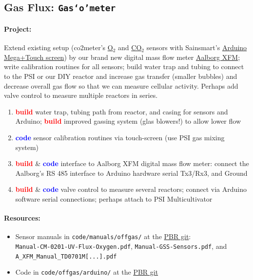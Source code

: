 \documentclass[12pt,a4paper]{scrartcl}
\newcommand{\git}[0]{\href{https://git.hhu.de/machne/pbr_hackathon_201503}{PBR git}}
\newcommand{\build}[0]{\textcolor{red}{\textbf{build}}}
\newcommand{\code}[0]{\textcolor{blue}{\textbf{code}}}
\newcommand{\gasometer}[0]{\texttt{Gas`o'meter}}
\newcommand{\ox}[0]{O$_2$}
\newcommand{\cox}[0]{CO$_2$}
\begin{document}
\newpage
\subsection{Gas Flux: \gasometer{}}
\label{gas}
\paragraph{Project:} 
Extend existing setup (co2meter's
\href{http://www.co2meter.com/collections/co2-sensors/oxygen-sensors}{\ox{}}
and
\href{http://www.co2meter.com/collections/co2-sensors/products/cozir-5-100-co2-sensor}{\cox{}}
sensors with Sainsmart's
\href{http://www.sainsmart.com/featured-products/sainsmart-mega2560-board-3-5-tft-lcd-module-display-shield-kit-for-atmel-atmega-avr-16au-atmega8u2.html}{Arduino
  Mega+Touch screen}) by our brand new digital mass flow meter
\href{http://www.aalborg.com/index.php/main_page/product_overview/id_product_overview/63}{Aalborg
  XFM}; write calibration routines for all sensors; build water trap
and tubing to connect to the PSI or our DIY reactor and increase gas
transfer (smaller bubbles) and decrease overall gas flow so that we
can measure cellular activity. Perhaps add valve control to measure
multiple reactors in series.

\begin{enumerate}
\item \build{} water trap, tubing path from reactor, and casing for
  sensors and Arduino; \build{} improved gassing system (glas
  blowers!) to allow lower flow
\item \code{} sensor calibration routines via touch-screen (use PSI
  gas mixing system)
\item \build{} \& \code{} interface to Aalborg XFM digital mass flow
  meter: connect the Aalborg's RS 485 interface to Arduino hardware
  serial Tx3/Rx3, and Ground
\item \build{} \& \code{} valve control to measure several reactors;
  connect via Arduino software serial connections; perhaps attach to
  PSI Multicultivator
\end{enumerate}

\paragraph{Resources:}
\begin{itemize}
\item Sensor manuals in \texttt{code/manuals/offgas/} at the
  \git{}:\\
  \texttt{Manual-CM-0201-UV-Flux-Oxygen.pdf},
  \texttt{Manual-GSS-Sensors.pdf}, and\\
  \texttt{A\_XFM\_Manual\_TD0701M[...].pdf}
\item Code in  \texttt{code/offgas/arduino/} at the
  \git{}
\end{itemize}
\end{document}
